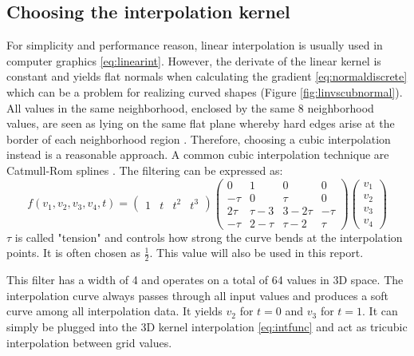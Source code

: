 \documentclass[12pt]{article}
\newcommand{\halfvalue}[1]{\frac{#1}{2}}
\begin{document}
\subsection{Choosing the interpolation kernel}
For simplicity and performance reason, linear interpolation is usually used in computer graphics \eqref{eq:linearint}. 
However, the derivate of the linear kernel is constant and yields flat normals when calculating the gradient \eqref{eq:normaldiscrete} which can be a problem for realizing curved shapes (Figure \ref{fig:linvscubnormal}). All values in the same neighborhood, enclosed by the same 8 neighborhood values, are seen as lying on the same flat plane whereby hard edges arise at the border of each neighborhood region . Therefore, choosing a cubic interpolation instead is a reasonable approach. A common cubic interpolation technique are Catmull-Rom splines \cite{twigg:2003}\cite{weston:2002}. The filtering can be expressed as:
\begin{equation}
f(v_1, v_2, v_3, v_4, t) = 
\begin{pmatrix}
1 & t & t^2 & t^3
\end{pmatrix}
\begin{pmatrix}
0 & 1 & 0 & 0 \\
-\tau & 0 & \tau & 0 \\
2 \tau & \tau - 3 & 3 - 2 \tau  & -\tau \\
- \tau & 2 - \tau & \tau - 2 & \tau
\end{pmatrix}
\begin{pmatrix}
v_1 \\
v_2 \\
v_3 \\
v_4
\end{pmatrix}
\end{equation} 
$\tau$ is called "tension" and controls how strong the curve bends at the interpolation points. It is often chosen as $\halfvalue{1}$. This value will also be used in this report.

This filter has a width of 4 and operates on a total of 64 values in 3D space. The interpolation curve always passes through all input values and produces a soft curve among all interpolation data. It yields $v_2$ for $t=0$ and $v_3$ for $t=1$. It can simply be plugged into the 3D kernel interpolation \eqref{eq:intfunc} and act as tricubic interpolation between grid values.
\end{document}
